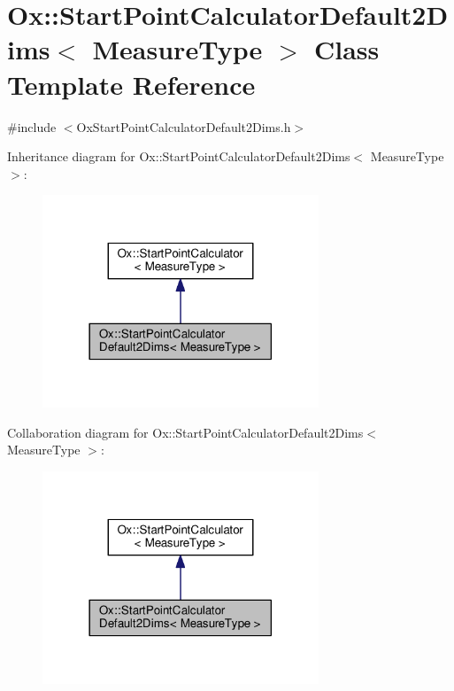 \hypertarget{class_ox_1_1_start_point_calculator_default2_dims}{\section{Ox\-:\-:Start\-Point\-Calculator\-Default2\-Dims$<$ Measure\-Type $>$ Class Template Reference}
\label{class_ox_1_1_start_point_calculator_default2_dims}
}


{\ttfamily \#include $<$Ox\-Start\-Point\-Calculator\-Default2\-Dims.\-h$>$}



Inheritance diagram for Ox\-:\-:Start\-Point\-Calculator\-Default2\-Dims$<$ Measure\-Type $>$\-:
\nopagebreak
\begin{figure}[H]
\begin{center}
\leavevmode
\includegraphics[width=234pt]{class_ox_1_1_start_point_calculator_default2_dims__inherit__graph}
\end{center}
\end{figure}


Collaboration diagram for Ox\-:\-:Start\-Point\-Calculator\-Default2\-Dims$<$ Measure\-Type $>$\-:
\nopagebreak
\begin{figure}[H]
\begin{center}
\leavevmode
\includegraphics[width=234pt]{class_ox_1_1_start_point_calculator_default2_dims__coll__graph}
\end{center}
\end{figure}
